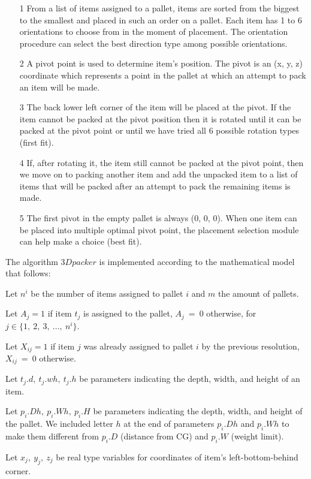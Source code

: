 \documentclass[preprint,authoryear]{elsarticle}
\begin{document}
\begin{itemize}
	\item[1] From a list of items assigned to a pallet, items are sorted from the biggest to the smallest and placed in such an order on a pallet. Each item has 1 to 6 orientations to choose from in the moment of placement. The orientation procedure can select the best direction type among possible orientations.
	\item[2] A pivot point is used to determine item's position. The pivot is an (x, y, z) coordinate which represents a point in the pallet at which an attempt to pack an item will be made.
	\item[3] The back lower left corner of the item will be placed at the pivot. If the item cannot be packed at the pivot position then it is rotated until it can be packed at the pivot point or until we have tried all 6 possible rotation types (first fit).
	\item[4] If, after rotating it, the item still cannot be packed at the pivot point, then we move on to packing another item and add the unpacked item to a list of items that will be packed after an attempt to pack the remaining items is made.
	\item[5] The first pivot in the empty pallet is always (0, 0, 0). When one item can be placed into multiple optimal pivot point, the placement selection module can help make a choice (best fit).
\end{itemize}

The algorithm $3Dpacker$ is implemented according to the mathematical model that follows:

Let $n^i$ be the number of items assigned to pallet $i$ and $m$ the amount of pallets.

Let $A_{j} = 1$ if item $t_j$ is assigned to the pallet, $A_{j}\ =\ 0$ otherwise, for $j \in \{1,\ 2,\ 3,\ ...,\ n^i\}$.

Let $X_{ij} = 1$ if item $j$ was already assigned to pallet $i$ by the previous resolution, $X_{ij}\ =\ 0$ otherwise.

Let $t_j.d,\ t_j.wh,\ t_j.h$ be parameters indicating the depth, width, and height of an item.

Let $p_i.Dh,\ p_i.Wh,\ p_i.H$ be parameters indicating the depth, width, and height of the pallet. We included letter $h$ at the end of parameters $p_i.Dh$ and $p_i.Wh$ to make them different from $p_i.D$ (distance from CG) and $p_i.W$ (weight limit).

Let $x_j,\ y_j,\ z_j$ be real type variables for coordinates of item's left-bottom-behind corner.
\end{document}
